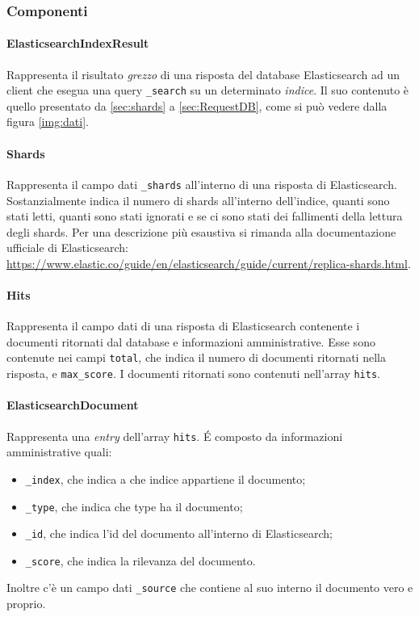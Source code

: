 \subsubsection{Componenti}

\paragraph{ElasticsearchIndexResult} \Spazio
\label{sec:elasticsearchIndexResult}
Rappresenta il risultato \emph{grezzo} di una risposta del database Elasticsearch ad un client che esegua una query \texttt{\_search} su un determinato \emph{indice}. Il suo contenuto è quello presentato da \ref{sec:shards} a \ref{sec:RequestDB}, come si può vedere dalla figura \ref{img:dati}.

\paragraph{Shards} \Spazio
\label{sec:shards}
Rappresenta il campo dati \texttt{\_shards} all'interno di una risposta di Elasticsearch. Sostanzialmente indica il numero di shards all'interno dell'indice, quanti sono stati letti, quanti sono stati ignorati e se ci sono stati dei fallimenti della lettura degli shards. Per una descrizione più esaustiva si rimanda alla documentazione ufficiale di Elasticsearch:\\ \href{https://www.elastic.co/guide/en/elasticsearch/guide/current/replica-shards.html}{https://www.elastic.co/guide/en/elasticsearch/guide/current/replica-shards.html}.

\paragraph{Hits} \Spazio
Rappresenta il campo dati di una risposta di Elasticsearch contenente i documenti ritornati dal database e informazioni amministrative. Esse sono contenute nei campi \texttt{total}, che indica il numero di documenti ritornati nella risposta, e \texttt{max\_score}. I documenti ritornati sono contenuti nell'array \texttt{hits}.

\paragraph{ElasticsearchDocument} \Spazio
Rappresenta una \emph{entry} dell'array \texttt{hits}. É composto da informazioni amministrative quali:
\begin{itemize}
	\item \texttt{\_index}, che indica a che indice appartiene il documento;
	\item \texttt{\_type}, che indica che type ha il documento;
	\item \texttt{\_id}, che indica l'id del documento all'interno di Elasticsearch; 
	\item \texttt{\_score}, che indica la rilevanza del documento.
\end{itemize}
Inoltre c'è un campo dati \texttt{\_source} che contiene al suo interno il documento vero e proprio.

